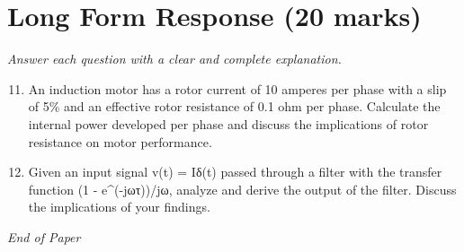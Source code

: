 \documentclass[12pt]{article}
\begin{document}
\section*{Long Form Response (20 marks)}
\textit{Answer each question with a clear and complete explanation.}
\begin{enumerate}[label=\arabic*.]
\setcounter{enumi}{10}
\item An induction motor has a rotor current of 10 amperes per phase with a slip of 5\% and an
effective rotor resistance of 0.1 ohm per phase. Calculate the internal power developed
per phase and discuss the implications of rotor resistance on motor performance.
\item Given an input signal v(t) = Iδ(t) passed through a filter with the transfer function (1 -
e\^{}(-jωτ))/jω, analyze and derive the output of the filter. Discuss the implications of
your findings.
\end{enumerate}

\vfill
\noindent\textit{End of Paper}
\end{document}
